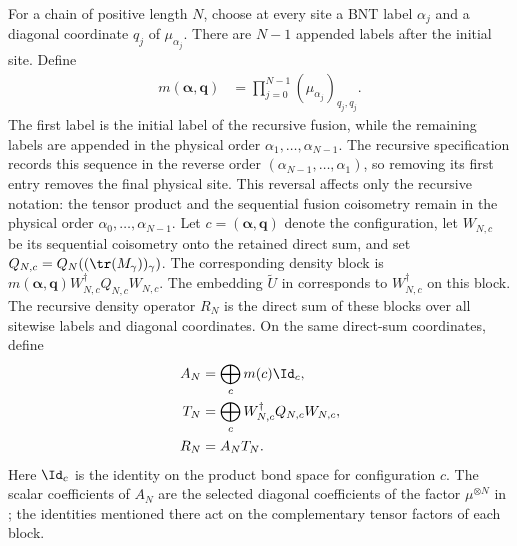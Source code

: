 \begin{definition}%
    \label{def:mpdo_topological_density_operator}
    \leanok
    For a chain of positive length $N$, choose at every site a BNT label
    $\alpha_j$ and a diagonal coordinate $q_j$ of $\mu_{\alpha_j}$.
    There are $N-1$ appended labels after the initial site. Define
    \begin{align}
        m(\boldsymbol\alpha,\boldsymbol q)
         & =\prod_{j=0}^{N-1}(\mu_{\alpha_j})_{q_j,q_j}.
        \label{eq:rfp_multiplicity_weight}
    \end{align}
    The first label is the initial label of the recursive fusion, while the
    remaining labels are appended in the physical order
    $\alpha_1,\ldots,\alpha_{N-1}$. The recursive specification records this
    sequence in the reverse order
    $(\alpha_{N-1},\ldots,\alpha_1)$, so removing its first entry removes the
    final physical site. This reversal affects only the recursive notation:
    the tensor product and the sequential fusion coisometry remain in the
    physical order $\alpha_0,\ldots,\alpha_{N-1}$. Let
    $c=(\boldsymbol\alpha,\boldsymbol q)$ denote the configuration,
    let $W_{N,c}$ be its sequential coisometry onto the retained direct sum,
    and set $Q_{N,c}=Q_N((\tr(M_\gamma))_\gamma)$.
    The corresponding density block is
    $m(\boldsymbol\alpha,\boldsymbol q)
        W_{N,c}^\dagger Q_{N,c}W_{N,c}$.
    The embedding $\widetilde U$ in \cite[line~999]{Cirac2016MPDO_arXiv}
    corresponds to $W_{N,c}^\dagger$ on this block.
    The recursive density operator $R_N$ is the direct sum of these blocks
    over all sitewise labels and diagonal coordinates.
    On the same direct-sum coordinates, define
    \begin{align}
        A_N
         & =\bigoplus_c m(c)\Id_c,
        \notag                                           \\
        T_N
         & =\bigoplus_c W_{N,c}^{\dagger}Q_{N,c}W_{N,c},
        \notag                                           \\
        R_N
         & =A_NT_N.
        \label{eq:rfp_density_factors}
    \end{align}
    Here $\Id_c$ is the identity on the product bond space for
    configuration $c$.
    The scalar coefficients of $A_N$ are the selected diagonal coefficients
    of the factor $\mu^{\otimes N}$ in
    \cite[line~999]{Cirac2016MPDO_arXiv}; the identities mentioned there act on
    the complementary tensor factors of each block.
\end{definition}

